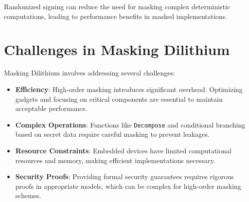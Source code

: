 Randomized signing can reduce the need for masking complex deterministic computations, leading to performance benefits in masked implementations.

\section{Challenges in Masking Dilithium}

Masking Dilithium involves addressing several challenges:

\begin{itemize}
    \item \textbf{Efficiency}: High-order masking introduces significant overhead. Optimizing gadgets and focusing on critical components are essential to maintain acceptable performance.
    \item \textbf{Complex Operations}: Functions like \texttt{Decompose} and conditional branching based on secret data require careful masking to prevent leakages.
    \item \textbf{Resource Constraints}: Embedded devices have limited computational resources and memory, making efficient implementations necessary.
    \item \textbf{Security Proofs}: Providing formal security guarantees requires rigorous proofs in appropriate models, which can be complex for high-order masking schemes.
\end{itemize}